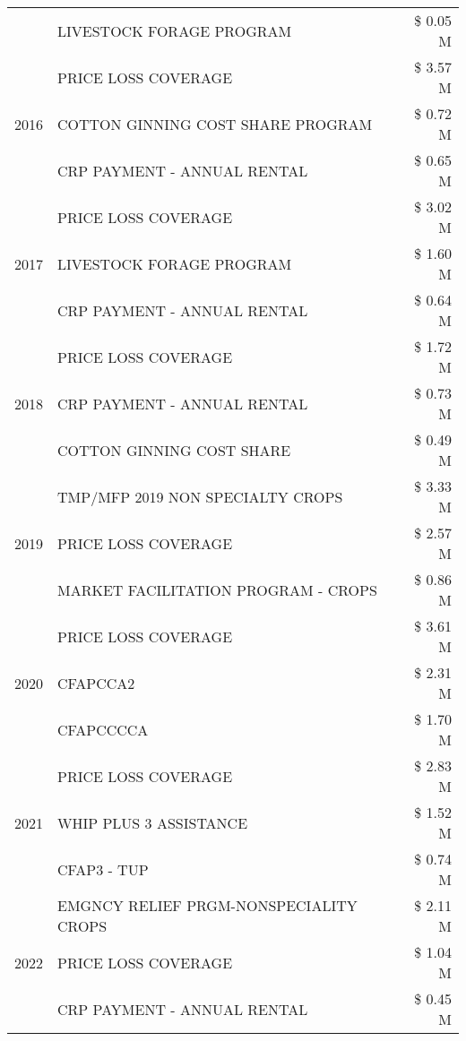 \begin{tabular}{llr}
 & LIVESTOCK FORAGE PROGRAM & \$ 0.05 M \\
\cline{1-3}
\multirow[t]{3}{*}{2016} & PRICE LOSS COVERAGE & \$ 3.57 M \\
 & COTTON GINNING COST SHARE PROGRAM & \$ 0.72 M \\
 & CRP PAYMENT - ANNUAL RENTAL & \$ 0.65 M \\
\cline{1-3}
\multirow[t]{3}{*}{2017} & PRICE LOSS COVERAGE & \$ 3.02 M \\
 & LIVESTOCK FORAGE PROGRAM & \$ 1.60 M \\
 & CRP PAYMENT - ANNUAL RENTAL & \$ 0.64 M \\
\cline{1-3}
\multirow[t]{3}{*}{2018} & PRICE LOSS COVERAGE & \$ 1.72 M \\
 & CRP PAYMENT - ANNUAL RENTAL & \$ 0.73 M \\
 & COTTON GINNING COST SHARE & \$ 0.49 M \\
\cline{1-3}
\multirow[t]{3}{*}{2019} & TMP/MFP 2019 NON SPECIALTY CROPS & \$ 3.33 M \\
 & PRICE LOSS COVERAGE & \$ 2.57 M \\
 & MARKET FACILITATION PROGRAM - CROPS & \$ 0.86 M \\
\cline{1-3}
\multirow[t]{3}{*}{2020} & PRICE LOSS COVERAGE & \$ 3.61 M \\
 & CFAPCCA2 & \$ 2.31 M \\
 & CFAPCCCCA & \$ 1.70 M \\
\cline{1-3}
\multirow[t]{3}{*}{2021} & PRICE LOSS COVERAGE & \$ 2.83 M \\
 & WHIP PLUS 3 ASSISTANCE & \$ 1.52 M \\
 & CFAP3 - TUP & \$ 0.74 M \\
\cline{1-3}
\multirow[t]{3}{*}{2022} & EMGNCY RELIEF PRGM-NONSPECIALITY CROPS & \$ 2.11 M \\
 & PRICE LOSS COVERAGE & \$ 1.04 M \\
 & CRP PAYMENT - ANNUAL RENTAL & \$ 0.45 M \\
\cline{1-3}
\bottomrule
\end{tabular}
